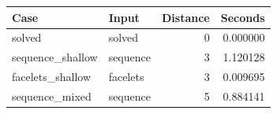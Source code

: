 {\small
\begin{tabular}{llrr}
\hline
Case & Input & Distance & Seconds \\
\hline
solved & solved & 0 & 0.000000 \\
sequence\_shallow & sequence & 3 & 1.120128 \\
facelets\_shallow & facelets & 3 & 0.009695 \\
sequence\_mixed & sequence & 5 & 0.884141 \\
\hline
\end{tabular}
}
